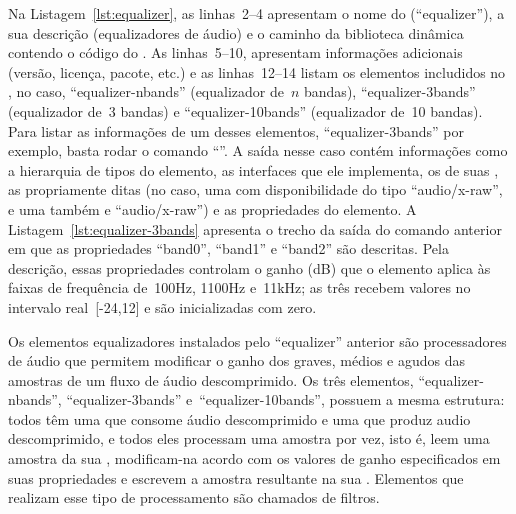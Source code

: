 \documentclass{SBCbookchapter}
\begin{document}


Na Listagem~\ref{lst:equalizer}, as linhas~2--4 apresentam o nome do
 (``equalizer''), a sua descrição (equalizadores de áudio) e o
caminho da biblioteca dinâmica contendo o código do .  As
linhas~5--10, apresentam informações adicionais (versão, licença, pacote,
etc.) e as linhas~12--14 listam os elementos includidos no , no
caso, ``equalizer-nbands'' (equalizador de~$n$ bandas), ``equalizer-3bands''
(equalizador de~3 bandas) e ``equalizer-10bands'' (equalizador de~10
bandas).  Para listar as informações de um desses elementos,
``equalizer-3bands'' por exemplo, basta rodar o comando
``''.  A saída nesse caso contém
informações como a hierarquia de tipos do elemento, as interfaces que ele
implementa, os  de suas , as  propriamente
ditas (no caso, uma  com disponibilidade  do tipo
``audio/x-raw'', e uma  também  e ``audio/x-raw'') e
as propriedades do elemento.  A Listagem~\ref{lst:equalizer-3bands}
apresenta o trecho da saída do comando anterior em que as propriedades
``band0'', ``band1'' e ``band2'' são descritas.  Pela descrição, essas
propriedades controlam o ganho (dB) que o elemento aplica às faixas de
frequência de~100Hz, 1100Hz e~11kHz; as três recebem valores no intervalo
real~[-24,12] e são inicializadas com zero.



Os elementos equalizadores instalados pelo  ``equalizer''
anterior são processadores de áudio que permitem modificar o ganho dos
graves, médios e agudos das amostras de um fluxo de áudio descomprimido.  Os
três elementos, ``equalizer-nbands'', ``equalizer-3bands''
e~``equalizer-10bands'', possuem a mesma estrutura: todos têm uma  que consome áudio descomprimido e uma  que produz audio
descomprimido, e todos eles processam uma amostra por vez, isto é, leem uma
amostra da sua , modificam-na acordo com os valores de ganho
especificados em suas propriedades e escrevem a amostra resultante na sua
.  Elementos que realizam esse tipo de processamento são
chamados de filtros.
\end{document}
